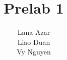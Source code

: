 \usepackage{fullpage}
\usepackage[fleqn]{amsmath}
\usepackage{graphicx}
\usepackage{import}

\author{
	Lana Azar\\
	Liao Duan\\
	Vy Nguyen
}
\title{Prelab 1}
